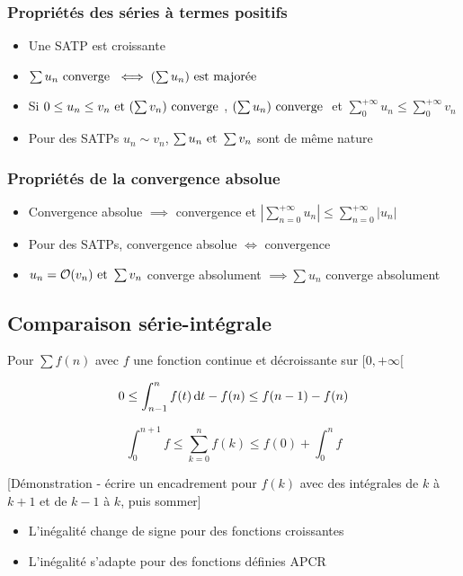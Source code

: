 \documentclass[openany]{book}
\begin{document}
\subsubsection{Propriétés des séries à termes positifs}
\begin{itemize}
    \item Une SATP est croissante
    \item $\sum u_n \text{ converge } \iff (\sum u_n) \text{ est majorée}$
    \item Si $0 \leq u_n \leq v_n \text{ et } (\sum v_n) \text{ converge }$, $(\sum u_n) \text{ converge }$ et $\sum_{0}^{+\infty} u_n \leq \sum_{0}^{+\infty} v_n$
    \item Pour des SATPs $u_n \sim v_n$, $\sum u_n \text{ et } \sum v_n$ sont de même nature
\end{itemize}

\subsubsection{Propriétés de la convergence absolue}
\begin{itemize}
    \item Convergence absolue $\implies$ convergence et $\left |\sum_{n=0}^{+ \infty} u_n \right | \leq \sum_{n=0}^{+\infty} |u_n|$
    \item Pour des SATPs, convergence absolue $\iff$ convergence
    \item $u_n =\mathcal{O}(v_n) \text{ et } \sum v_n $ converge absolument $\implies \sum u_n$ converge absolument
\end{itemize}

\subsection{Comparaison série-intégrale}
Pour $\sum f(n)$ avec $f$ une fonction continue et décroissante sur $[0, +\infty[$

\[ 0 \leq \int_{n-1}^{n} f(t) \, \text{d}t - f(n) \leq f(n-1) - f(n) \]

\[ \int_{0}^{n+1} f \leq  \sum_{k=0}^{n} f(k) \leq f(0) + \int_{0}^{n} f \]

[Démonstration - écrire un encadrement pour $f(k)$ avec des intégrales de $k$ à $k+1$ et de $k-1$ à $k$, puis sommer]
\begin{itemize}
    \item L'inégalité change de signe pour des fonctions croissantes
    \item L'inégalité s'adapte pour des fonctions définies APCR
\end{itemize}
\end{document}

